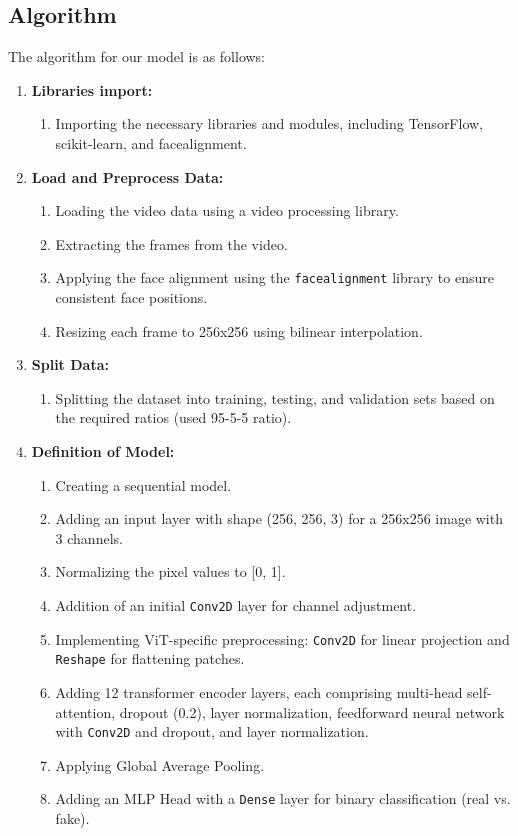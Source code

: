 \subsection{Algorithm}
The algorithm  for our model is as follows:

\begin{enumerate}
    \item \textbf{Libraries import:}
          \begin{enumerate}
             \item Importing the necessary libraries and modules, including TensorFlow, scikit-learn, and facealignment.
          \end{enumerate}
 
    \item \textbf{Load and Preprocess Data:}
          \begin{enumerate}
             \item Loading the video data using a video processing library.
             \item Extracting the frames from the video.
             \item Applying the face alignment using the \texttt{facealignment} library to ensure consistent face positions.
             \item Resizing each frame to 256x256 using bilinear interpolation.
          \end{enumerate}
 
    \item \textbf{Split Data:}
          \begin{enumerate}
             \item Splitting the dataset into training, testing, and validation sets based on the required ratios (used 95-5-5 ratio).
          \end{enumerate}
 
    \item \textbf{Definition of Model:}
          \begin{enumerate}
             \item Creating a sequential model.
             \item Adding an input layer with shape (256, 256, 3) for a 256x256 image with 3 channels.
             \item Normalizing the pixel values to [0, 1].
             \item Addition of an initial \texttt{Conv2D} layer for channel adjustment.
             \item Implementing ViT-specific preprocessing: \texttt{Conv2D} for linear projection and \texttt{Reshape} for flattening patches.
             \item Adding 12 transformer encoder layers, each comprising multi-head self-attention, dropout (0.2), layer normalization, feedforward neural network with \texttt{Conv2D} and dropout, and layer normalization.
             \item Applying Global Average Pooling.
             \item Adding an MLP Head with a \texttt{Dense} layer for binary classification (real vs. fake).
          \end{enumerate}
 

\end{enumerate}
